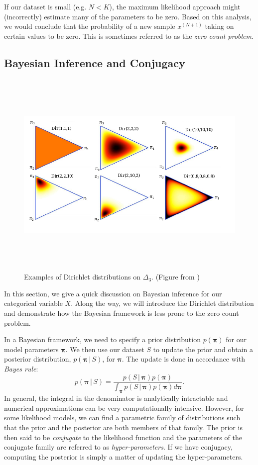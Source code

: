 \documentclass[final,3p,times,twocolumn]{elsarticle}
\let\bs\boldsymbol
\begin{document}
If our dataset is small (e.g. $N < K$), the maximum likelihood approach might (incorrectly) estimate many of the parameters to be zero.
Based on this analysis, we would conclude that the probability of a new sample $x^{(N+1)}$ taking on certain values to be zero.
This is sometimes referred to as the \emph{zero count problem}.

\subsection{Bayesian Inference and Conjugacy}
\label{sect:conjugacy}

\begin{figure}
\includegraphics[width=\textwidth,height=4in]{dir.png}
\caption{Examples of Dirichlet distributions on $\Delta_3$. (Figure from \cite{ywt07})}
\label{fig:dir}
\end{figure}

In this section, we give a quick discussion on Bayesian inference for our categorical variable $X$.
Along the way, we will introduce the Dirichlet distribution and demonstrate how the Bayesian framework is less prone to the zero count problem.

In a Bayesian framework, we need to specify a prior distribution $p(\bs \pi)$ for our model parameters $\bs \pi$.
We then use our dataset $S$ to update the prior and obtain a posterior distribution, $p(\bs \pi\,|\,S)$, for $\bs \pi$.
The update is done in accordance with \emph{Bayes rule}:
\begin{equation}
\label{eqn:bayes}
p(\bs \pi \,|\, S) = \frac{p(S\,|\,\bs \pi) p(\bs \pi)}{\int_{\bs \pi} p(S\,|\,\bs \pi)p(\bs \pi)d\bs\pi}.
\end{equation}
In general, the integral in the denominator is analytically intractable and numerical approximations can be very computationally intensive.
However, for some likelihood models, we can find a parametric family of distributions such that the prior and the posterior are both members of that family. 
The prior is then said to be \emph{conjugate} to the likelihood function and the parameters of the conjugate family are referred to as \emph{hyper-parameters}.
If we have conjugacy, computing the posterior is simply a matter of updating the hyper-parameters.
\end{document}
